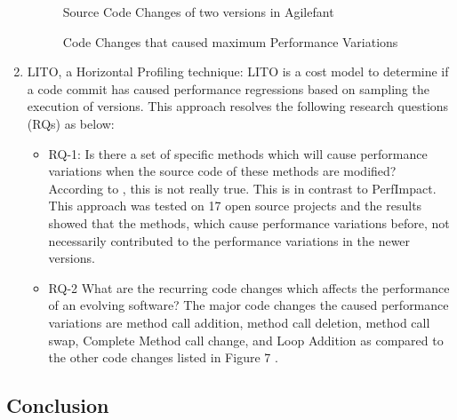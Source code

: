 \documentclass[article,type=msc,colorback,12pt,accentcolor=tud7b]{tudthesis}
\begin{document}
\begin{enumerate}
 \begin{figure}
 \begin{center}
  \makebox[\textwidth]{\texttt{[image: B1]}}
  \makebox[\textwidth]{\texttt{[image: B2]}}
\end{center}
\caption{Source Code Changes of two versions in Agilefant \cite{luomining}}
\end{figure}

 \begin{figure}
 \begin{center}
  \makebox[\textwidth]{\texttt{[image: B3]}}
\end{center}
\caption{Code Changes that caused maximum Performance Variations \cite{sandoval2016learning}}
\end{figure}

\item{LITO, a Horizontal Profiling technique:} 
LITO is a cost model to determine if a code commit has caused performance regressions based on sampling the execution of versions. This approach resolves the following research questions (RQs) as below:

\begin{itemize}

\item RQ-1: Is there a set of specific methods which will cause performance variations when the source code of these methods are modified? According to \cite{sandoval2016learning}, this is not really true. This is in contrast to PerfImpact. This approach was tested on 17 open source projects and the results showed that the methods, which cause performance variations before, not necessarily contributed to the performance variations in the newer versions.

\item RQ-2  What are the recurring code changes which affects the performance of an evolving software? The major code changes the caused performance variations are method call addition, method call deletion, method call swap, Complete Method call change, and Loop Addition  as compared to the other code changes listed in Figure 7 \cite{sandoval2016learning}.

\end{itemize}
\end{enumerate}	
	
	\subsection{Conclusion}
	
\end{document}
